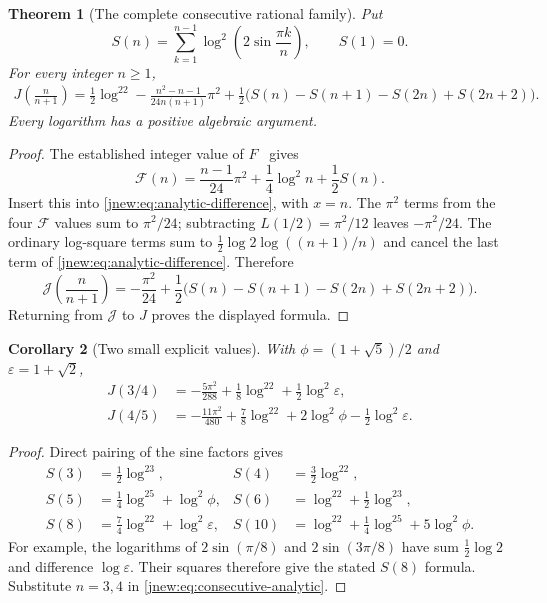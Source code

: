 \documentclass[11pt,a4paper]{article}
\newtheorem{theorem}{Theorem}[section]
\newtheorem{corollary}[theorem]{Corollary}
\theoremstyle{definition}
\theoremstyle{remark}
\numberwithin{equation}{section}
\begin{document}
\begin{theorem}[The complete consecutive rational family]
\label{jnew:thm:consecutive-analytic}
Put
\[
 S(n)=\sum_{k=1}^{n-1}\log^2\left(2\sin\frac{\pi k}{n}\right),
 \qquad S(1)=0.
\]
For every integer $n\ge1$,
\begin{align}
 \boxed{\displaystyle
 J\left(\frac{n}{n+1}\right)
 =\frac12\log^22
  -\frac{n^2-n-1}{24n(n+1)}\pi^2
  +\frac12\bigl(S(n)-S(n+1)-S(2n)+S(2n+2)\bigr).}
 \label{jnew:eq:consecutive-analytic}
\end{align}
Every logarithm has a positive algebraic argument.
\end{theorem}
\begin{proof}
The established integer value of $F$~\cite[eq.~(23)]{RadchenkoZagier} gives
\begin{equation}\label{jnew:eq:F-normalized-integer}
 \mathcal F(n)=\frac{n-1}{24}\pi^2
              +\frac14\log^2n+\frac12S(n).
\end{equation}
Insert this into \eqref{jnew:eq:analytic-difference}, with $x=n$.
The $\pi^2$ terms from the four $\mathcal F$ values sum to
$\pi^2/24$; subtracting $L(1/2)=\pi^2/12$ leaves $-\pi^2/24$.
The ordinary log-square terms sum to
$\tfrac12\log2\log((n+1)/n)$ and cancel the last term of
\eqref{jnew:eq:analytic-difference}. Therefore
\[
 \mathcal J\left(\frac n{n+1}\right)
 =-\frac{\pi^2}{24}
   +\frac12\bigl(S(n)-S(n+1)-S(2n)+S(2n+2)\bigr).
\]
Returning from $\mathcal J$ to $J$ proves the displayed formula.
\end{proof}

\begin{corollary}[Two small explicit values]\label{jnew:cor:small-evenodd}
With $\phi=(1+\sqrt5)/2$ and $\varepsilon=1+\sqrt2$,
\begin{align}
 J(3/4)&=-\frac{5\pi^2}{288}+\frac18\log^22
                         +\frac12\log^2\varepsilon,
 \label{jnew:eq:J34}\\
 J(4/5)&=-\frac{11\pi^2}{480}+\frac78\log^22
             +2\log^2\phi-\frac12\log^2\varepsilon.
 \label{jnew:eq:J45}
\end{align}
\end{corollary}
\begin{proof}
Direct pairing of the sine factors gives
\begin{align*}
 S(3)&=\tfrac12\log^23,& S(4)&=\tfrac32\log^22,\\
 S(5)&=\tfrac14\log^25+\log^2\phi,
 &S(6)&=\log^22+\tfrac12\log^23,\\
 S(8)&=\tfrac74\log^22+\log^2\varepsilon,
 &S(10)&=\log^22+\tfrac14\log^25+5\log^2\phi.
\end{align*}
For example, the logarithms of $2\sin(\pi/8)$ and
$2\sin(3\pi/8)$ have sum $\tfrac12\log2$ and difference
$\log\varepsilon$. Their squares therefore give the stated $S(8)$
formula. Substitute $n=3,4$ in
\eqref{jnew:eq:consecutive-analytic}.
\end{proof}
\end{document}

